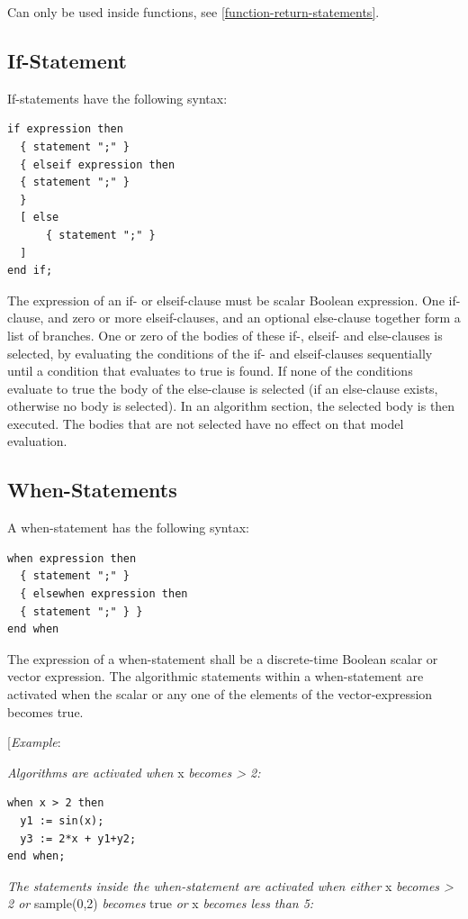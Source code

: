 \documentclass[10pt,a4paper]{report}
\def\doublelabel#1{\label{#1}}
\begin{document}
Can only be used inside functions, see \ref{function-return-statements}.

\subsection{If-Statement}\doublelabel{if-statement}

If-statements have the following syntax:

\begin{lstlisting}[language=grammar]
if expression then
  { statement ";" }
  { elseif expression then
  { statement ";" }
  }
  [ else 
      { statement ";" }
  ]
end if;
\end{lstlisting}

The expression of an if- or elseif-clause must be scalar Boolean
expression. One if-clause, and zero or more elseif-clauses, and an
optional else-clause together form a list of branches. One or zero of
the bodies of these if-, elseif- and else-clauses is selected, by
evaluating the conditions of the if- and elseif-clauses sequentially
until a condition that evaluates to true is found. If none of the
conditions evaluate to true the body of the else-clause is selected (if
an else-clause exists, otherwise no body is selected). In an algorithm
section, the selected body is then executed. The bodies that are not
selected have no effect on that model evaluation.

\subsection{When-Statements}\doublelabel{when-statements}

A when-statement has the following syntax:

\begin{lstlisting}[language=grammar]
when expression then
  { statement ";" }
  { elsewhen expression then
  { statement ";" } }
end when
\end{lstlisting}
The expression of a when-statement shall be a discrete-time Boolean
scalar or vector expression. The algorithmic statements within a
when-statement are activated when the scalar or any one of the elements
of the vector-expression becomes true.

{[}\emph{Example}:

\emph{Algorithms are activated when} x \emph{becomes \textgreater{} 2:}

\begin{lstlisting}[language=modelica]
when x > 2 then
  y1 := sin(x);
  y3 := 2*x + y1+y2;
end when;
\end{lstlisting}
\emph{The statements inside the when-statement are activated when
either} x \emph{becomes \textgreater{} 2 or} sample(0,2) \emph{becomes}
true \emph{or} x \emph{becomes less than 5:}
\end{document}
